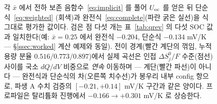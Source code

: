 \begin{figure}[t]
{각 $\bar x$ 에서 전하 보존 음함수~\eqref{eq:implicit} 를 풀어 $U_{\mathrm{oc}}$ 를 얻은 뒤 단순식~\eqref{eq:weighted}
(회색)과 완전식~\eqref{eq:complete}(파란 굵은 실선)을 식 그대로 평가한 값이다. 검은 점 다섯 개는
표~\ref{tab:qrev} 의 다섯 SOC 값과 일치한다(예: $\bar x{=}0.25$ 에서 완전식 $-0.204$, 단순식 $-0.134$
mV/K --- \S\ref{ssec:worked} 계산 예제와 동일). 전이 경계(빨간 계단의 꺾임, 누적 용량 분율
$0.516/0.773/0.897$)에서 실제 곡선은 인접 $\Delta S^0_j/F$ 수준(점선) 사이를 국소 $dQ/dV$ 비중으로
\emph{연속} 이동하며 --- 계단(빨간 파선)이 아니다 --- 완전식과 단순식의 차(오른쪽 치수선)가 봉우리 내부
config 항으로, 파생 A 수치 검증의 $[-0.21,+0.14]$ mV/K 구간과 같은 양이다. 프로파일은 탈리튬화
진행에서 $-0.166\to+0.301$ mV/K 로 상승한다.}
\label{fig:cand-ff1-3}
\end{figure}
